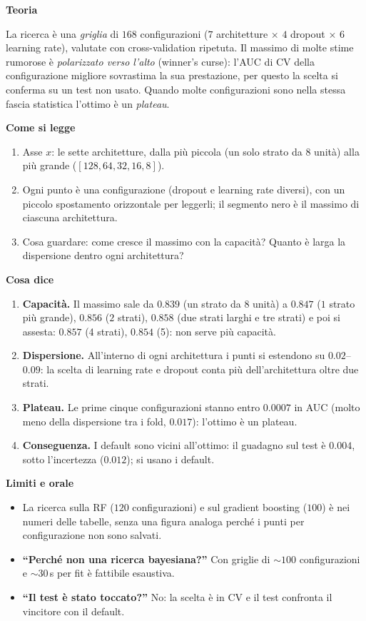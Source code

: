 \documentclass[10.5pt,a4paper]{article}
\newcommand{\sez}[1]{\par\Needspace{6\baselineskip}\medskip\noindent\textbf{\large #1}\par\nopagebreak\smallskip}
\begin{document}
\sez{Teoria}
La ricerca è una \emph{griglia} di $168$ configurazioni ($7$ architetture $\times$ $4$ dropout $\times$ $6$ learning rate), valutate con cross-validation ripetuta. Il massimo di molte stime rumorose è \emph{polarizzato verso l'alto} (winner's curse): l'AUC di CV della configurazione migliore sovrastima la sua prestazione, per questo la scelta si conferma su un test non usato. Quando molte configurazioni sono nella stessa fascia statistica l'ottimo è un \emph{plateau}.

\sez{Come si legge}
\begin{enumerate}
\item Asse $x$: le sette architetture, dalla più piccola (un solo strato da $8$ unità) alla più grande ($[128,64,32,16,8]$).
\item Ogni punto è una configurazione (dropout e learning rate diversi), con un piccolo spostamento orizzontale per leggerli; il segmento nero è il massimo di ciascuna architettura.
\item Cosa guardare: come cresce il massimo con la capacità? Quanto è larga la dispersione dentro ogni architettura?
\end{enumerate}

\sez{Cosa dice}
\begin{enumerate}
\item \textbf{Capacità.} Il massimo sale da $0.839$ (un strato da $8$ unità) a $0.847$ ($1$ strato più grande), $0.856$ ($2$ strati), $0.858$ (due strati larghi e tre strati) e poi si assesta: $0.857$ (4 strati), $0.854$ (5): non serve più capacità.
\item \textbf{Dispersione.} All'interno di ogni architettura i punti si estendono su $0.02$--$0.09$: la scelta di learning rate e dropout conta più dell'architettura oltre due strati.
\item \textbf{Plateau.} Le prime cinque configurazioni stanno entro $0.0007$ in AUC (molto meno della dispersione tra i fold, $0.017$): l'ottimo è un plateau.
\item \textbf{Conseguenza.} I default sono vicini all'ottimo: il guadagno sul test è $0.004$, sotto l'incertezza ($0.012$); si usano i default.
\end{enumerate}

\sez{Limiti e orale}
\begin{itemize}
\item La ricerca sulla RF ($120$ configurazioni) e sul gradient boosting ($100$) è nei numeri delle tabelle, senza una figura analoga perché i punti per configurazione non sono salvati.
\item \textbf{``Perché non una ricerca bayesiana?''} Con griglie di $\sim100$ configurazioni e $\sim30\,$s per fit è fattibile esaustiva.
\item \textbf{``Il test è stato toccato?''} No: la scelta è in CV e il test confronta il vincitore con il default.
\end{itemize}
\end{document}
